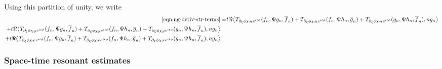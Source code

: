 \documentclass[letterpaper, reqno,final]{amsart}
\newcommand{\cS}{\mathcal{S}}
\newcommand{\cT}{\mathcal{T}}
\newcommand{\cR}{\mathcal{R}}
\newcommand{\discrAvg}{\Psi}
\begin{document}
Using this partition of unity, we write
\begin{subequations}\begin{align}
        \eqref{eqn:ng-deriv-str-terms} =& t\Re \bigl\langle T_{\partial_\xi \phi \chi_\cR e^{it\phi}}(f_n, \discrAvg g_{n}, \overline{f}_n) + T_{\partial_\xi \phi \chi_\cR e^{it\phi}}(f_n, \discrAvg h_{n}, \overline{g}_n) + T_{\partial_\xi \phi \chi_\cR e^{it\phi}}(g_n, \discrAvg h_{n}, \overline{f}_n), ng_n \bigr\rangle
    \label{eqn:space-time-res-term}\\
    \begin{split}
        &\cramped{+ t\Re \bigl\langle T_{\partial_\xi \phi \chi_\cS e^{it\phi}}(f_n, \discrAvg g_{n}, \overline{f}_n) + T_{\partial_\xi \phi \chi_\cS e^{it\phi}}(f_n, \discrAvg h_{n}, \overline{g}_n) + T_{\partial_\xi \phi \chi_\cS e^{it\phi}}(g_n, \discrAvg h_{n}, \overline{f}_n), ng_n \bigr\rangle}
   \end{split}\label{eqn:space-non-res-term}\\
   \begin{split}
        &\cramped{+t\Re \bigl\langle T_{\partial_\xi \phi \chi_\cT e^{it\phi}}(f_n, \discrAvg g_{n}, \overline{f}_n) + T_{\partial_\xi \phi \chi_\cT e^{it\phi}}(f_n, \discrAvg h_{n}, \overline{g}_n) +
        T_{\partial_\xi\phi \chi_\cT e^{it\phi}}(g_n, \discrAvg h_{n}, \overline{f}_n), ng_n \bigr\rangle}
        \end{split}\label{eqn:time-non-res-term}
\end{align}\end{subequations}

\subsubsection{Space-time resonant estimates}
\end{document}

